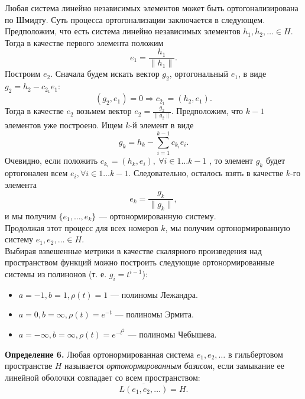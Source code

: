 \documentclass[12pt,a4paper, titlepage]{article}
\begin{document}
Любая система линейно независимых элементов может быть ортогонализирована по Шмидту. Суть процесса ортогонализации заключается в следующем. Предположим, что есть система линейно независимых элементов $h_1, h_2, \dots \in H$. Тогда в качестве первого элемента положим
$$
e_1 = \frac{h_1}{\|h_1\|}.
$$
Построим $e_2$. Сначала будем искать вектор $g_2$, ортогональный $e_1$, в виде $g_2 = h_2 - c_{2_1} e_1$:
$$
(g_2, e_1) = 0 \Rightarrow c_{2_1} = (h_2, e_1).
$$
Тогда в качестве $e_2$ возьмем вектор $e_2 = \frac{g_2}{\|g_2\|}$. Предположим, что $k - 1$ элементов уже построено. Ищем $k$-й элемент в виде
$$
g_k = h_k - \sum_{i=1}^{k-1} c_{k_i} e_i.
$$
Очевидно, если положить $c_{k_i} = (h_k, e_i),\ \forall i \in 1 \dots k - 1$ , то элемент $g_k$ будет ортогонален всем $e_i, \forall i \in 1 \dots k - 1$. Следовательно, осталось взять в качестве $k$-го элемента 
$$
e_k = \frac{g_k}{\|g_k\|},
$$
и мы получим $\{e_1, \dots, e_k\}$ --- ортонормированную систему.\\

Продолжая этот процесс для всех номеров $k$, мы получим ортонормированную систему $e_1, e_2, \dots \in H$.\\

Выбирая взвешенные метрики в качестве скалярного произведения над пространством функций можно построить следующие ортонормированные системы из полинонов (т. е. $ g_i = t^{i-1}$):

\begin{itemize}
\item $a = -1, b = 1, \rho(t) = 1$ --- полиномы Лежандра.
\item $a = 0, b = \infty, \rho(t) = e^{-t}$ --- полиномы Эрмита.
\item $a = -\infty, b = \infty, \rho(t) = e^{-t^2}$ --- полиномы Чебышева.
\end{itemize}



\textbf{Определение 6.} Любая ортонормированная система $e_1, e_2, \dots$ в гильбертовом пространстве $H$ называется \textit{ортонормированным базисом}, если замыкание ее линейной оболочки совпадает со всем пространством:
$$
\overline{L(e_1, e_2, \dots )} = H.
$$
\end{document}

